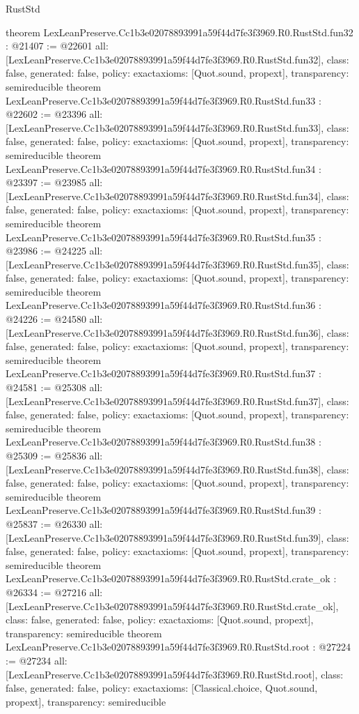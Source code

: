 \begin{lexlean}{RustStd}
\begin{coremodule}
{}
theorem LexLeanPreserve.Cc1b3e02078893991a59f44d7fe3f3969.R0.RustStd.fun32 : @21407 := @22601 {
  all: [LexLeanPreserve.Cc1b3e02078893991a59f44d7fe3f3969.R0.RustStd.fun32],
  class: false,
  generated: false,
  policy: exact{axioms: [Quot.sound, propext]},
  transparency: semireducible
}
theorem LexLeanPreserve.Cc1b3e02078893991a59f44d7fe3f3969.R0.RustStd.fun33 : @22602 := @23396 {
  all: [LexLeanPreserve.Cc1b3e02078893991a59f44d7fe3f3969.R0.RustStd.fun33],
  class: false,
  generated: false,
  policy: exact{axioms: [Quot.sound, propext]},
  transparency: semireducible
}
theorem LexLeanPreserve.Cc1b3e02078893991a59f44d7fe3f3969.R0.RustStd.fun34 : @23397 := @23985 {
  all: [LexLeanPreserve.Cc1b3e02078893991a59f44d7fe3f3969.R0.RustStd.fun34],
  class: false,
  generated: false,
  policy: exact{axioms: [Quot.sound, propext]},
  transparency: semireducible
}
theorem LexLeanPreserve.Cc1b3e02078893991a59f44d7fe3f3969.R0.RustStd.fun35 : @23986 := @24225 {
  all: [LexLeanPreserve.Cc1b3e02078893991a59f44d7fe3f3969.R0.RustStd.fun35],
  class: false,
  generated: false,
  policy: exact{axioms: [Quot.sound, propext]},
  transparency: semireducible
}
theorem LexLeanPreserve.Cc1b3e02078893991a59f44d7fe3f3969.R0.RustStd.fun36 : @24226 := @24580 {
  all: [LexLeanPreserve.Cc1b3e02078893991a59f44d7fe3f3969.R0.RustStd.fun36],
  class: false,
  generated: false,
  policy: exact{axioms: [Quot.sound, propext]},
  transparency: semireducible
}
theorem LexLeanPreserve.Cc1b3e02078893991a59f44d7fe3f3969.R0.RustStd.fun37 : @24581 := @25308 {
  all: [LexLeanPreserve.Cc1b3e02078893991a59f44d7fe3f3969.R0.RustStd.fun37],
  class: false,
  generated: false,
  policy: exact{axioms: [Quot.sound, propext]},
  transparency: semireducible
}
theorem LexLeanPreserve.Cc1b3e02078893991a59f44d7fe3f3969.R0.RustStd.fun38 : @25309 := @25836 {
  all: [LexLeanPreserve.Cc1b3e02078893991a59f44d7fe3f3969.R0.RustStd.fun38],
  class: false,
  generated: false,
  policy: exact{axioms: [Quot.sound, propext]},
  transparency: semireducible
}
theorem LexLeanPreserve.Cc1b3e02078893991a59f44d7fe3f3969.R0.RustStd.fun39 : @25837 := @26330 {
  all: [LexLeanPreserve.Cc1b3e02078893991a59f44d7fe3f3969.R0.RustStd.fun39],
  class: false,
  generated: false,
  policy: exact{axioms: [Quot.sound, propext]},
  transparency: semireducible
}
theorem LexLeanPreserve.Cc1b3e02078893991a59f44d7fe3f3969.R0.RustStd.crate_ok : @26334 := @27216 {
  all: [LexLeanPreserve.Cc1b3e02078893991a59f44d7fe3f3969.R0.RustStd.crate_ok],
  class: false,
  generated: false,
  policy: exact{axioms: [Quot.sound, propext]},
  transparency: semireducible
}
theorem LexLeanPreserve.Cc1b3e02078893991a59f44d7fe3f3969.R0.RustStd.root : @27224 := @27234 {
  all: [LexLeanPreserve.Cc1b3e02078893991a59f44d7fe3f3969.R0.RustStd.root],
  class: false,
  generated: false,
  policy: exact{axioms: [Classical.choice, Quot.sound, propext]},
  transparency: semireducible
}


\end{coremodule}
\end{lexlean}
